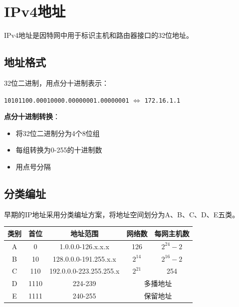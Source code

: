 \documentclass[12pt,a4paper,openany]{ctexbook}
\begin{document}
\section{IPv4地址}
IPv4地址是因特网中用于标识主机和路由器接口的32位地址。

\subsection{地址格式}
32位二进制，用点分十进制表示：
\begin{center}
\texttt{10101100.00010000.00000001.00000001} $\Leftrightarrow$ \texttt{172.16.1.1}
\end{center}

\textbf{点分十进制转换}：
\begin{itemize}[leftmargin=2em,itemsep=0pt]
    \item 将32位二进制分为4个8位组
    \item 每组转换为0-255的十进制数
    \item 用点号分隔
\end{itemize}

\subsection{分类编址}
早期的IP地址采用分类编址方案，将地址空间划分为A、B、C、D、E五类。

\begin{center}
\end{center}

\begin{table}[htbp]
\centering\small
\begin{tabular}{ccccc}
\toprule
\textbf{类别} & \textbf{首位} & \textbf{地址范围} & \textbf{网络数} & \textbf{每网主机数} \\
\midrule
A & 0 & 1.0.0.0-126.x.x.x & 126 & $2^{24}-2$ \\
B & 10 & 128.0.0.0-191.255.x.x & $2^{14}$ & $2^{16}-2$ \\
C & 110 & 192.0.0.0-223.255.255.x & $2^{21}$ & 254 \\
D & 1110 & 224-239 & \multicolumn{2}{c}{多播地址} \\
E & 1111 & 240-255 & \multicolumn{2}{c}{保留地址} \\
\bottomrule
\end{tabular}
\end{table}
\end{document}

